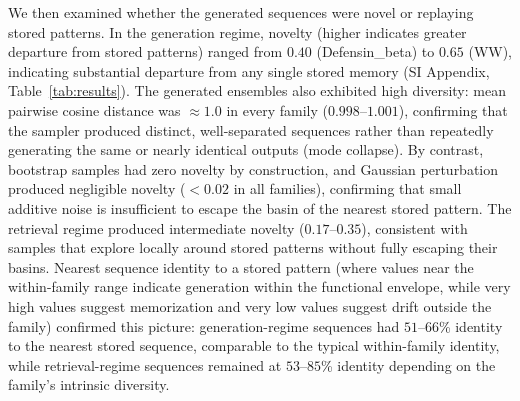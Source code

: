 We then examined whether the generated sequences were novel or replaying stored patterns. In the generation regime, novelty (higher indicates greater departure from stored patterns) ranged from $0.40$ (Defensin\_beta) to $0.65$ (WW), indicating substantial departure from any single stored memory (SI Appendix, Table~\ref{tab:results}). The generated ensembles also exhibited high diversity: mean pairwise cosine distance was ${\approx}1.0$ in every family ($0.998$--$1.001$), confirming that the sampler produced distinct, well-separated sequences rather than repeatedly generating the same or nearly identical outputs (mode collapse). By contrast, bootstrap samples had zero novelty by construction, and Gaussian perturbation produced negligible novelty ($<0.02$ in all families), confirming that small additive noise is insufficient to escape the basin of the nearest stored pattern. The retrieval regime produced intermediate novelty ($0.17$--$0.35$), consistent with samples that explore locally around stored patterns without fully escaping their basins. Nearest sequence identity to a stored pattern (where values near the within-family range indicate generation within the functional envelope, while very high values suggest memorization and very low values suggest drift outside the family) confirmed this picture: generation-regime sequences had $51$--$66$\% identity to the nearest stored sequence, comparable to the typical within-family identity, while retrieval-regime sequences remained at $53$--$85$\% identity depending on the family's intrinsic diversity.

